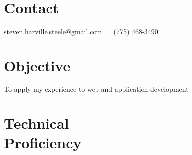 \documentclass[margin,line]{resume}
\begin{document}
\begin{resume}

\vspace{1em}



\section{\mysidestyle Contact}

steven.harville.steele@gmail.com \ \textbf{\textbar} \ (775) 468-3490



\section{\mysidestyle Objective}


To apply my experience to web and application development







\section{\mysidestyle Technical\\Proficiency}


\end{resume}
\end{document}
